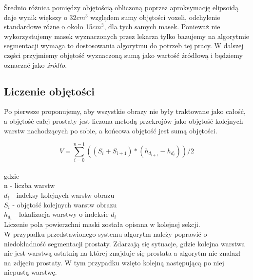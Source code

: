 \documentclass[a4paper,11pt,twoside]{report}
\theoremstyle{definition}
\begin{document}
Średnio różnica pomiędzy objętością obliczoną poprzez aproksymację elipsoidą daje wynik większy o 32$cm^3$ względem sumy objętości voxeli, odchylenie standardowe różne o około 15$cm^3$, dla tych samych masek. Ponieważ nie wykorzystujemy masek wyznaczonych przez lekarza tylko bazujemy na algorytmie segmentacji wymaga to dostosowania algorytmu do potrzeb tej pracy. W dalszej części przyjmiemy objętość wyznaczoną sumą jako wartość źródłową i będziemy oznaczać jako \textit{źródło}.

\subsection{Liczenie objętości}

Po pierwsze proponujemy, aby wszystkie obrazy nie były traktowane jako całość, a objętość całej prostaty jest liczona metodą przekrojów jako objętość kolejnych warstw nachodzących po sobie, a końcowa objętość jest sumą objętości. 

\[V = \sum_{i=0}^{n-1} ((S_i + S_{i+1}) * (h_{d_{i+1}} - h_{d_i})) / 2 \]
\\
gdzie\\
n - liczba warstw \\
\(d_i\) - indeksy kolejnych warstw obrazu \\
\(S_i\) - objętość kolejnych warstw obrazu \\
\(h_{d_i}\) - lokalizacja warstwy o indeksie \(d_{i}\) \\

Liczenie pola powierzchni maski została opisana w kolejnej sekcji. \\
W przypadku przedstawionego systemu algorytm należy poprawić o niedokładność segmentacji prostaty. Zdarzają się sytuacje, gdzie kolejna warstwa nie jest warstwą ostatnią na której znajduje się prostata a algorytm nie znalazł na zdjęciu prostaty. W tym przypadku wzięto kolejną następującą po niej niepustą warstwę.
\end{document}
